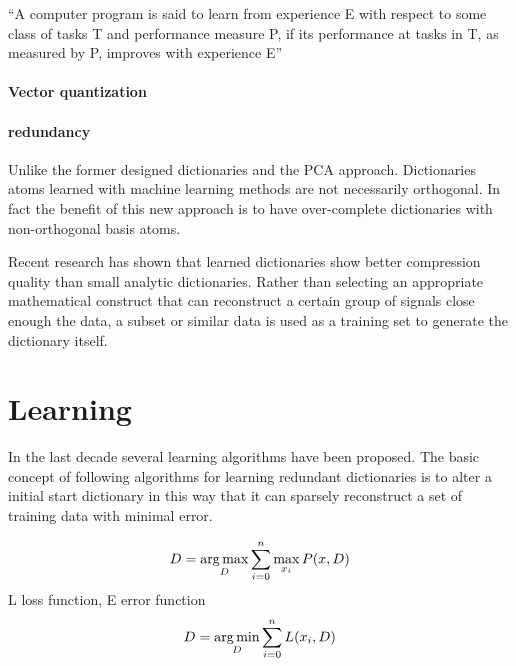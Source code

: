 ``A computer program is said to learn from experience E with respect to
some class of tasks T and performance measure P, if its performance at tasks in
T, as measured by P, improves with experience E''


\paragraph{Vector quantization}



\paragraph{redundancy}
Unlike the former designed dictionaries and the PCA approach. Dictionaries atoms
learned with machine learning methods are not necessarily orthogonal. In fact
the benefit of this new approach is to have over-complete dictionaries with
non-orthogonal basis atoms.



Recent research has shown that learned dictionaries show better
compression quality than small analytic dictionaries\cite{Chen1998}.
\cite{Aharon2006} \cite{Mairal2010} Rather than selecting an appropriate
mathematical construct that can reconstruct a certain group of signals close
enough the data, a subset or similar data is used as a training set to generate
the dictionary itself.




\section{Learning}
\cite{Olshausen1997,Lewicki2000,Aharon2006}
In the last decade several learning algorithms have been proposed. The basic
concept of following algorithms for learning redundant dictionaries is to alter
a initial start dictionary in this way that it can sparsely reconstruct a set of
training data with minimal error. 

\begin{align} 
D = \operatorname*{arg\,max}_{D} \sum_{i=0}^n \max_{x_i} P(x,D)
\end{align}
L loss function, E error function
\begin{align} 
D = \operatorname*{arg\,min}_{D} \sum_{i=0}^n L(x_i,D)
\end{align}

